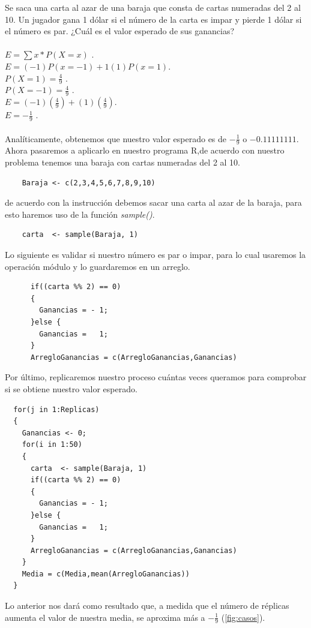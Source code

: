 \documentclass[]{article}
\begin{document}
Se saca una carta al azar de una baraja que consta de cartas numeradas del 2 al 10. Un jugador gana 1 dólar si el número de la carta es impar y pierde 1 dólar si el número es par. ¿Cuál es el valor esperado de sus ganancias?\\
\\
$E = \sum x *P(X=x)$ .\\
$E = (-1)P(x=-1) + 1(1)P(x=1)$.\\
$P(X=1) = \frac{4}{9}$ .\\
$P(X=-1) = \frac{4}{9}$ .\\
$E = (-1)(\frac{4}{9}) +(1)(\frac{4}{9})$. \\
$E = -\frac{1}{9}$ .\\
\\
Analíticamente, obtenemos que nuestro valor esperado es de $-\frac{1}{9}$ o $-0.11111111$.
Ahora pasaremos a aplicarlo en nuestro programa R,de acuerdo con nuestro problema tenemos una baraja con cartas numeradas del 2 al 10.
   \begin{lstlisting}
	Baraja <- c(2,3,4,5,6,7,8,9,10)
   \end{lstlisting}
de acuerdo con la instrucción debemos sacar una carta al azar de la baraja, para esto haremos uso de la función \textit{sample()}.
   \begin{lstlisting}
	carta  <- sample(Baraja, 1)
   \end{lstlisting}
Lo siguiente es validar si nuestro número es par o impar, para lo cual usaremos la operación módulo y lo guardaremos en un arreglo.
   \begin{lstlisting}
      if((carta %% 2) == 0)
      {
        Ganancias = - 1;
      }else {
        Ganancias =   1;
      }
	  ArregloGanancias = c(ArregloGanancias,Ganancias)

   \end{lstlisting}
   Por último, replicaremos nuestro proceso cuántas veces queramos para comprobar si se obtiene nuestro valor esperado.
      \begin{lstlisting}
  for(j in 1:Replicas)
  {
    Ganancias <- 0;
    for(i in 1:50)
    {
      carta  <- sample(Baraja, 1)
      if((carta %% 2) == 0)
      {
        Ganancias = - 1;
      }else {
        Ganancias =   1;
      }
      ArregloGanancias = c(ArregloGanancias,Ganancias)
    }
    Media = c(Media,mean(ArregloGanancias))
  }

      \end{lstlisting}
      Lo anterior nos dará como resultado que, a medida que el número de réplicas aumenta el valor de nuestra media, se aproxima más a $-\frac{1}{9}$ (\autoref{fig:casos}).
\end{document}
